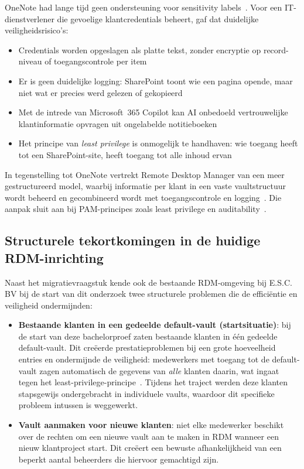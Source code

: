 OneNote had lange tijd geen ondersteuning voor sensitivity labels~\autocite{hay2025onenote}. Voor een IT-dienstverlener die gevoelige klantcredentials beheert, gaf dat duidelijke veiligheidsrisico's:

\begin{itemize}
  \item Credentials worden opgeslagen als platte tekst, zonder encryptie op record-niveau of toegangscontrole per item
  \item Er is geen duidelijke logging: SharePoint toont wie een pagina opende, maar niet wat er precies werd gelezen of gekopieerd
  \item Met de intrede van Microsoft~365 Copilot kan AI onbedoeld vertrouwelijke klantinformatie opvragen uit ongelabelde notitieboeken~\autocite{hay2025onenote}
  \item Het principe van \emph{least privilege} is onmogelijk te handhaven: wie toegang heeft tot een SharePoint-site, heeft toegang tot alle inhoud ervan~\autocite{garbis2021pam}
\end{itemize}

In tegenstelling tot OneNote vertrekt Remote Desktop Manager van een meer gestructureerd model, waarbij informatie per klant in een vaste vaultstructuur wordt beheerd en gecombineerd wordt met toegangscontrole en logging~\autocite{devolutions2025rdm}. Die aanpak sluit aan bij PAM-principes zoals least privilege en auditability~\autocite{souppaya2021pam}.

\subsection{Structurele tekortkomingen in de huidige RDM-inrichting}

Naast het migratievraagstuk kende ook de bestaande RDM-omgeving bij E.S.C. BV bij de start van dit onderzoek twee structurele problemen die de efficiëntie en veiligheid ondermijnden:

\begin{itemize}
  \item \textbf{Bestaande klanten in een gedeelde default-vault (startsituatie)}: bij de start van deze bachelorproef zaten bestaande klanten in één gedeelde default-vault. Dit creëerde prestatieproblemen bij een grote hoeveelheid entries en ondermijnde de veiligheid: medewerkers met toegang tot de default-vault zagen automatisch de gegevens van \emph{alle} klanten daarin, wat ingaat tegen het least-privilege-principe~\autocite{garbis2021pam}. Tijdens het traject werden deze klanten stapsgewijs ondergebracht in individuele vaults, waardoor dit specifieke probleem intussen is weggewerkt.
  \item \textbf{Vault aanmaken voor nieuwe klanten}: niet elke medewerker beschikt over de rechten om een nieuwe vault aan te maken in RDM wanneer een nieuw klantproject start. Dit creëert een bewuste afhankelijkheid van een beperkt aantal beheerders die hiervoor gemachtigd zijn.
\end{itemize}

